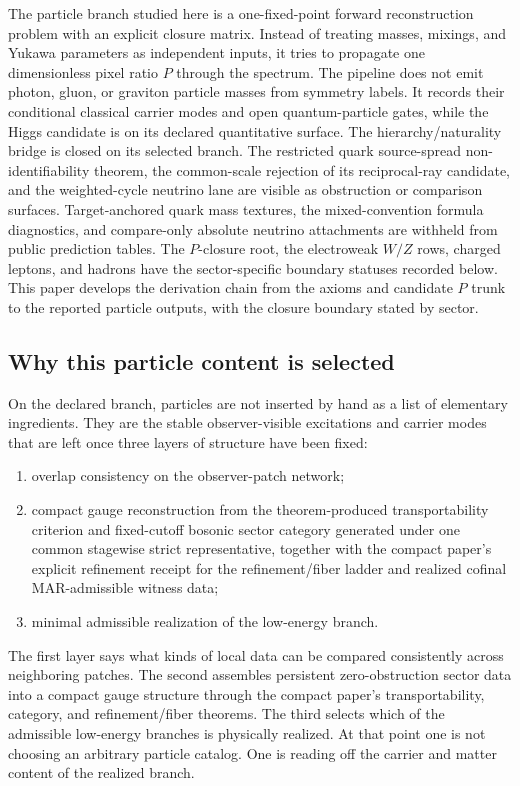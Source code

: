 \documentclass[11pt]{article}
\begin{document}
The particle branch studied here is a one-fixed-point forward reconstruction problem with an
explicit closure matrix. Instead of treating masses, mixings, and Yukawa parameters as independent
inputs, it tries to propagate one dimensionless pixel ratio \(P\) through the spectrum. The
pipeline does not emit photon, gluon, or graviton particle masses from symmetry labels. It records
their conditional classical carrier modes and open quantum-particle gates, while the Higgs
candidate is on its declared quantitative surface. The hierarchy/naturality bridge is closed on its
selected branch. The restricted quark source-spread non-identifiability theorem, the common-scale
rejection of its reciprocal-ray candidate, and the weighted-cycle neutrino lane are
visible as obstruction or comparison surfaces. Target-anchored quark mass textures, the mixed-convention
formula diagnostics, and compare-only absolute neutrino attachments are withheld from public
prediction tables. The \(P\)-closure root,
the electroweak \(W/Z\) rows, charged leptons, and hadrons have the sector-specific boundary
statuses recorded below. This paper develops the
derivation chain from the axioms and candidate \(P\) trunk to the reported particle outputs, with
the closure boundary stated by sector.

\subsection{Why this particle content is selected}

On the declared branch, particles are not inserted by hand as a list of elementary
ingredients. They are the stable observer-visible excitations and carrier modes that
are left once three layers of structure have been fixed:
\begin{enumerate}[leftmargin=2em]
\item overlap consistency on the observer-patch network;
\item compact gauge reconstruction from the theorem-produced transportability criterion and fixed-cutoff bosonic sector category generated under one common stagewise strict representative, together with the compact paper's explicit refinement receipt for the refinement/fiber ladder and realized cofinal MAR-admissible witness data;
\item minimal admissible realization of the low-energy branch.
\end{enumerate}
The first layer says what kinds of local data can be compared consistently across neighboring
patches. The second assembles persistent zero-obstruction sector data into a compact gauge
structure through the compact paper's transportability, category, and refinement/fiber theorems.
The third selects which of the admissible low-energy branches is physically realized.
At that point one is not choosing an arbitrary particle catalog. One is reading off the
carrier and matter content of the realized branch.
\end{document}
